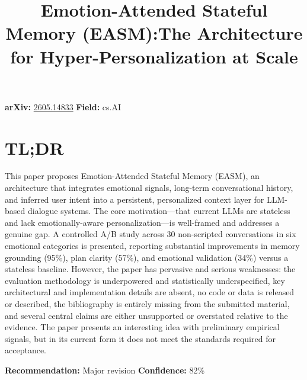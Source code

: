 \documentclass[11pt]{article}
\title{Emotion-Attended Stateful Memory (EASM):The Architecture for Hyper-Personalization at Scale}
\date{}
\begin{document}
\maketitle

\noindent\textbf{arXiv:} \href{https://arxiv.org/abs/2605.14833}{2605.14833} \quad \textbf{Field:} cs.AI\\

\section*{TL;DR}
This paper proposes Emotion-Attended Stateful Memory (EASM), an architecture that integrates emotional signals, long-term conversational history, and inferred user intent into a persistent, personalized context layer for LLM-based dialogue systems. The core motivation—that current LLMs are stateless and lack emotionally-aware personalization—is well-framed and addresses a genuine gap. A controlled A/B study across 30 non-scripted conversations in six emotional categories is presented, reporting substantial improvements in memory grounding (95\%), plan clarity (57\%), and emotional validation (34\%) versus a stateless baseline. However, the paper has pervasive and serious weaknesses: the evaluation methodology is underpowered and statistically underspecified, key architectural and implementation details are absent, no code or data is released or described, the bibliography is entirely missing from the submitted material, and several central claims are either unsupported or overstated relative to the evidence. The paper presents an interesting idea with preliminary empirical signals, but in its current form it does not meet the standards required for acceptance.

\textbf{Recommendation:} Major revision \quad \textbf{Confidence:} 82\%\\
\end{document}
